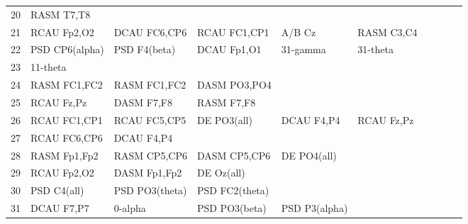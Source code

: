 \begin{landscape}
\begin{table}[]
\begin{tabular}{l|llllllll}
20       & RASM T7,T8     &                &                &                &                &                &                &                &               &              \\
21       & RCAU Fp2,O2    & DCAU FC6,CP6   & RCAU FC1,CP1   & A/B Cz         & RASM C3,C4     &                &                &                &               &              \\
22       & PSD CP6(alpha) & PSD F4(beta)   & DCAU Fp1,O1    & 31-gamma       & 31-theta       &                &                &                &               &              \\
23       & 11-theta       &                &                &                &                &                &                &                &               &              \\
24       & RASM FC1,FC2   & RASM FC1,FC2   & DASM PO3,PO4   &                &                &                &                &                &               &              \\
25       & RCAU Fz,Pz     & DASM F7,F8     & RASM F7,F8     &                &                &                &                &                &               &              \\
26       & RCAU FC1,CP1   & RCAU FC5,CP5   & DE PO3(all)    & DCAU F4,P4     & RCAU Fz,Pz     &                &                &                &               &              \\
27       & RCAU FC6,CP6   & DCAU F4,P4     &                &                &                &                &                &                &               &              \\
28       & RASM Fp1,Fp2   & RASM CP5,CP6   & DASM CP5,CP6   & DE PO4(all)    &                &                &                &                &               &              \\
29       & RCAU Fp2,O2    & DASM Fp1,Fp2   & DE Oz(all)     &                &                &                &                &                &               &              \\
30       & PSD C4(all)    & PSD PO3(theta) & PSD FC2(theta) &                &                &                &                &                &               &              \\
31       & DCAU F7,P7     & 0-alpha        & PSD PO3(beta)  & PSD P3(alpha)  &                &                &                &                &               &              \\
\end{tabular}
\end{table}
\end{landscape}
